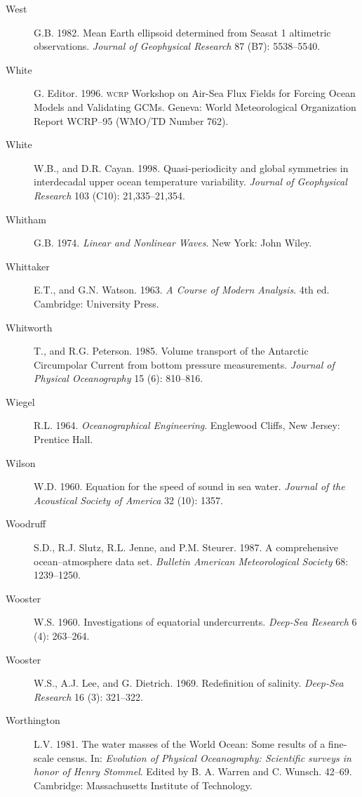 \begin{description}
\item [West]G.B. 1982. Mean Earth ellipsoid determined from Seasat 1 altimetric
observations. \textit{Journal of Geophysical Research} 87 (B7): 5538--5540.

\item [White]G. Editor. 1996. \textsc{wcrp} Workshop on Air-Sea Flux Fields for Forcing Ocean Models and Validating GCMs. Geneva: World Meteorological Organization Report WCRP--95 (WMO/TD Number 762).

\item [White]W.B., and D.R. Cayan. 1998. Quasi-periodicity and global symmetries in interdecadal upper ocean temperature variability. \textit{Journal of Geophysical Research} 103 (C10): 21,335--21,354.

\item [Whitham]G.B. 1974. \textit{Linear and Nonlinear Waves}.  New York: John Wiley.

\item [Whittaker]E.T., and G.N. Watson. 1963. \textit{A Course of Modern Analysis}. 4th ed.  Cambridge: University Press.

\item [Whitworth]T., and R.G. Peterson. 1985. Volume transport of the Antarctic
Circumpolar Current from bottom pressure measurements. \textit{Journal of Physical
Oceanography} 15 (6): 810--816.

\item [Wiegel]R.L. 1964. \textit{Oceanographical Engineering}.  Englewood Cliffs, New Jersey: Prentice Hall.

\item [Wilson]W.D. 1960. Equation for the speed of sound in sea water. \textit{Journal of the Acoustical Society of America} 32 (10): 1357.

\item [Woodruff]S.D., R.J. Slutz, R.L. Jenne, and P.M. Steurer. 1987. A comprehensive ocean--atmosphere data set. \textit{Bulletin American Meteorological Society} 68: 1239--1250.

\item [Wooster]W.S. 1960. Investigations of equatorial undercurrents. \textit{Deep-Sea Research} 6 (4): 263--264.

\item [Wooster]W.S., A.J. Lee, and G. Dietrich. 1969. Redefinition of salinity.
\textit{Deep-Sea Research} 16 (3): 321--322.

\item [Worthington]L.V. 1981. The water masses of the World Ocean: Some results of a fine-scale census. In: \textit{Evolution of Physical Oceanography: Scientific surveys in honor of Henry Stommel}. Edited by B. A. Warren and C. Wunsch. 42--69. Cambridge: Massachusetts Institute of Technology.


\end{description}
